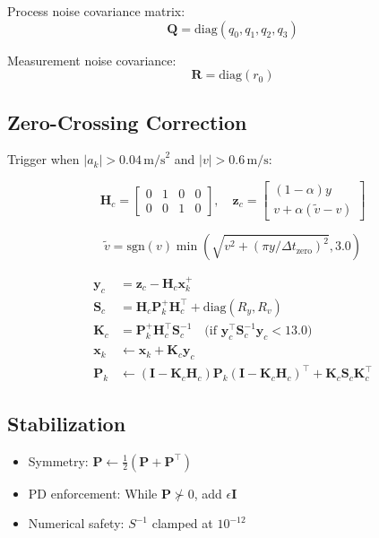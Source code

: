 \documentclass[11pt,letterpaper]{article}
\begin{document}
Process noise covariance matrix:
\begin{equation}
\bm{Q} = \mathrm{diag}(q_0, q_1, q_2, q_3)
\end{equation}

Measurement noise covariance:
\begin{equation}
\bm{R} = \mathrm{diag}(r_0)
\end{equation}

\subsection{Zero-Crossing Correction}
Trigger when $|a_k| > 0.04\,\text{m/s}^2$ and $|v| > 0.6\,\text{m/s}$:

\begin{equation}
\bm{H}_c = \begin{bmatrix}0&1&0&0\\0&0&1&0\end{bmatrix}, \quad
\bm{z}_c = \begin{bmatrix}(1-\alpha)y\\v+\alpha(\tilde{v}-v)\end{bmatrix}
\end{equation}

\begin{equation}
\tilde{v} = \mathrm{sgn}(v)\min\left(\sqrt{v^2 + (\pi y/\Delta t_\mathrm{zero})^2}, 3.0\right)
\end{equation}

\begin{align}
\bm{y}_c &= \bm{z}_c - \bm{H}_c\bm{x}_k^+ \\
\bm{S}_c &= \bm{H}_c\bm{P}_k^+\bm{H}_c^\top + \mathrm{diag}(R_y, R_v) \\
\bm{K}_c &= \bm{P}_k^+\bm{H}_c^\top \bm{S}_c^{-1} \quad \text{(if $\bm{y}_c^\top\bm{S}_c^{-1}\bm{y}_c < 13.0$)} \\
\bm{x}_k &\leftarrow \bm{x}_k + \bm{K}_c\bm{y}_c \\
\bm{P}_k &\leftarrow (\bm{I}-\bm{K}_c\bm{H}_c)\bm{P}_k(\bm{I}-\bm{K}_c\bm{H}_c)^\top + \bm{K}_c\bm{S}_c\bm{K}_c^\top
\end{align}

\subsection{Stabilization}
\begin{itemize}
\item Symmetry: $\bm{P} \leftarrow \frac{1}{2}(\bm{P}+\bm{P}^\top)$
\item PD enforcement: While $\bm{P} \not\succ 0$, add $\epsilon\bm{I}$
\item Numerical safety: $S^{-1}$ clamped at $10^{-12}$
\end{itemize}
\end{document}
